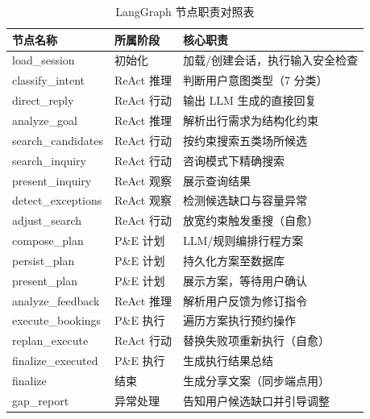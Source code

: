 \documentclass[12pt,a4paper]{ctexart}
\begin{document}
\begin{table}[ht]
\centering
\small
\begin{tabular}{p{3cm}p{3.5cm}p{6.5cm}}
\toprule
\textbf{节点名称} & \textbf{所属阶段} & \textbf{核心职责} \\
\midrule
load\_session       & 初始化    & 加载/创建会话，执行输入安全检查 \\
classify\_intent    & ReAct 推理 & 判断用户意图类型（7 分类） \\
direct\_reply       & ReAct 行动 & 输出 LLM 生成的直接回复 \\
analyze\_goal       & ReAct 推理 & 解析出行需求为结构化约束 \\
search\_candidates  & ReAct 行动 & 按约束搜索五类场所候选 \\
search\_inquiry     & ReAct 行动 & 咨询模式下精确搜索 \\
present\_inquiry    & ReAct 观察 & 展示查询结果 \\
detect\_exceptions  & ReAct 观察 & 检测候选缺口与容量异常 \\
adjust\_search      & ReAct 行动 & 放宽约束触发重搜（自愈） \\
compose\_plan       & P\&E 计划   & LLM/规则编排行程方案 \\
persist\_plan       & P\&E 计划   & 持久化方案至数据库 \\
present\_plan       & P\&E 计划   & 展示方案，等待用户确认 \\
analyze\_feedback   & ReAct 推理 & 解析用户反馈为修订指令 \\
execute\_bookings   & P\&E 执行   & 遍历方案执行预约操作 \\
replan\_execute     & ReAct 行动 & 替换失败项重新执行（自愈） \\
finalize\_executed  & P\&E 执行   & 生成执行结果总结 \\
finalize            & 结束      & 生成分享文案（同步端点用） \\
gap\_report         & 异常处理  & 告知用户候选缺口并引导调整 \\
\bottomrule
\end{tabular}
\caption{LangGraph 节点职责对照表}
\label{tab:nodes}
\end{table}
\end{document}

